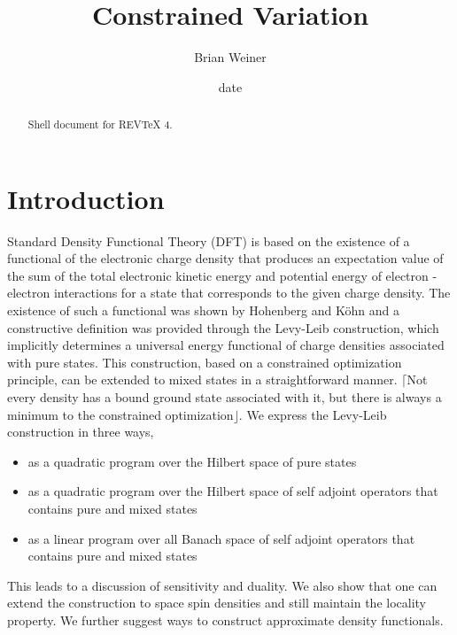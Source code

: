 \documentclass[aps,preprint]{revtex4}%
\begin{document}
\preprint{ }
\title[Con. Var]{Constrained Variation}
\author{Brian Weiner}

\begin{abstract}
Shell document for REV\TeX{} 4.

\end{abstract}
\date[Date text]{date}

\endpage{ }
\maketitle
\tableofcontents


\section{Introduction\label{Intro}}

Standard Density Functional Theory (DFT) is based on the existence of a
functional of the electronic charge density that produces an expectation value
of the sum of the total electronic kinetic energy and potential energy of
electron - electron interactions for a state that corresponds to the given
charge density. The existence of such a functional was shown by Hohenberg and
K\"{o}hn \cite{H&K} and a constructive definition was provided through the
Levy-Leib \cite{Lieb}\cite{Levy} construction, which implicitly determines a
universal energy functional of charge densities associated with pure states.
This construction, based on a constrained optimization principle, can be
extended to mixed states in a straightforward manner. $\lceil$Not every
density has a bound ground state associated with it, but there is always a
minimum to the constrained optimization$\rfloor$. We express the Levy-Leib
construction in three ways,

\begin{itemize}
\item as a quadratic program over the Hilbert space of pure states

\item as a quadratic program over the Hilbert space of self adjoint operators
that contains pure and mixed states

\item as a linear program over all Banach space of self adjoint operators that
contains pure and mixed states
\end{itemize}

This leads to a discussion of sensitivity and duality. We also show that one
can extend the construction to space spin densities and still maintain the
locality property. We further suggest ways to construct approximate density functionals.
\end{document}
